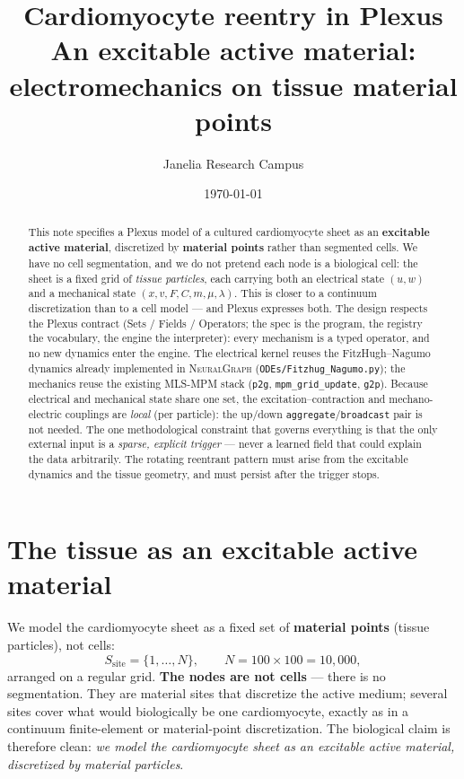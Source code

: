 \documentclass[11pt]{article}
\title{\textbf{Cardiomyocyte reentry in Plexus}\\[3pt]
\large An excitable active material: electromechanics on tissue material points}
\author{Janelia Research Campus}
\date{\today}
\newcommand{\code}[1]{\texttt{#1}}
\begin{document}
\maketitle

\begin{abstract}
This note specifies a Plexus model of a cultured cardiomyocyte sheet as an
\textbf{excitable active material}, discretized by \textbf{material points} rather
than segmented cells. We have no cell segmentation, and we do not pretend each node
is a biological cell: the sheet is a fixed grid of \emph{tissue particles}, each
carrying both an electrical state $(u,w)$ and a mechanical state
$(x,v,F,C,m,\mu,\lambda)$. This is closer to a continuum discretization than to a
cell model --- and Plexus expresses both. The design respects the Plexus contract
(Sets / Fields / Operators; the spec is the program, the registry the vocabulary,
the engine the interpreter): every mechanism is a typed operator, and no new
dynamics enter the engine. The electrical kernel reuses the FitzHugh--Nagumo
dynamics already implemented in \textsc{NeuralGraph} (\code{ODEs/Fitzhug\_Nagumo.py});
the mechanics reuse the existing MLS-MPM stack (\code{p2g}, \code{mpm\_grid\_update},
\code{g2p}). Because electrical and mechanical state share one set, the
excitation--contraction and mechano-electric couplings are \emph{local} (per
particle): the up/down \code{aggregate}/\code{broadcast} pair is not needed. The one
methodological constraint that governs everything is that the only external input is
a \emph{sparse, explicit trigger} --- never a learned field that could explain the
data arbitrarily. The rotating reentrant pattern must arise from the excitable
dynamics and the tissue geometry, and must persist after the trigger stops.
\end{abstract}

\section{The tissue as an excitable active material}

We model the cardiomyocyte sheet as a fixed set of \textbf{material points} (tissue
particles), not cells:
\[
  S_{\mathrm{site}}=\{1,\ldots,N\},\qquad N = 100\times 100 = 10{,}000,
\]
arranged on a regular grid. \textbf{The nodes are not cells} --- there is no
segmentation. They are material sites that discretize the active medium; several
sites cover what would biologically be one cardiomyocyte, exactly as in a continuum
finite-element or material-point discretization. The biological claim is therefore
clean: \emph{we model the cardiomyocyte sheet as an excitable active material,
discretized by material particles}.
\end{document}
